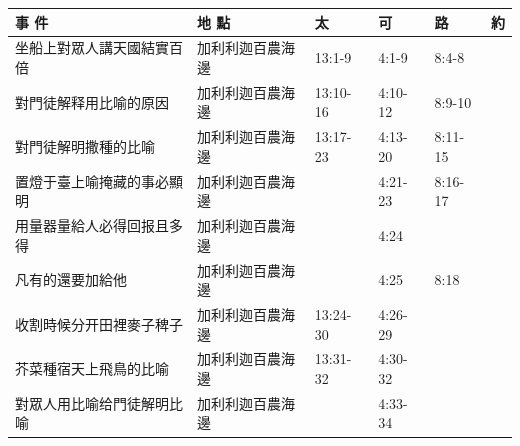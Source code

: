 \begin{table}[H]
\centering 
\begin{tabular}{p{13.07em}|p{8.43em}|p{5.285em}|p{5.57em}|p{5.285em}|p{4.855em}}
\toprule
\textbf{事 件} & \textbf{地 點} & \textbf{太} & \textbf{可} & \textbf{路} & \textbf{約} \\\midrule

坐船上對眾人講天國結實百倍& 加利利迦百農海邊& \multicolumn{1}{l|}{13:1-9} & \multicolumn{1}{l|}{4:1-9} & 8:4-8 & \multicolumn{1}{r}{} \\ \midrule
對門徒解释用比喻的原因& 加利利迦百農海邊& \multicolumn{1}{l|}{13:10-16} & \multicolumn{1}{l|}{4:10-12} & 8:9-10 & \multicolumn{1}{r}{} \\ \midrule
對門徒解明撒種的比喻& 加利利迦百農海邊& \multicolumn{1}{l|}{13:17-23} & \multicolumn{1}{l|}{4:13-20} & 8:11-15 & \multicolumn{1}{r}{} \\ \midrule

置燈于臺上喻掩藏的事必顯明& 加利利迦百農海邊& \multicolumn{1}{l|}{} & \multicolumn{1}{l|}{4:21-23} & 8:16-17 & \multicolumn{1}{r}{} \\ \midrule

用量器量給人必得回报且多得& 加利利迦百農海邊& \multicolumn{1}{l|}{} & \multicolumn{1}{l|}{4:24} & & \multicolumn{1}{r}{} \\ \midrule

凡有的還要加給他& 加利利迦百農海邊& \multicolumn{1}{l|}{} & \multicolumn{1}{l|}{4:25} & 8:18& \multicolumn{1}{r}{} \\ \midrule

收割時候分开田裡麥子稗子& 加利利迦百農海邊& \multicolumn{1}{l|}{13:24-30} & \multicolumn{1}{l|}{4:26-29} & & \multicolumn{1}{r}{} \\ \midrule

芥菜種宿天上飛鳥的比喻& 加利利迦百農海邊& \multicolumn{1}{l|}{13:31-32} & \multicolumn{1}{l|}{4:30-32} & & \multicolumn{1}{r}{} \\ \midrule

對眾人用比喻给門徒解明比喻& 加利利迦百農海邊& \multicolumn{1}{l|}{} & \multicolumn{1}{l|}{4:33-34} & & \multicolumn{1}{r}{} \\ \midrule


\end{tabular}
\end{table}
